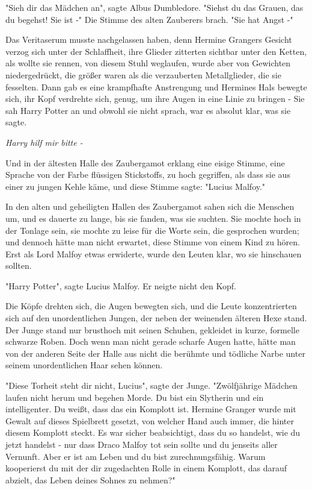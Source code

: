 {"Sieh dir das Mädchen an", sagte Albus Dumbledore. "Siehst du das Grauen, das du begehst! Sie ist -" Die Stimme des alten Zauberers brach. "Sie hat Angst -"

Das Veritaserum musste nachgelassen haben, denn Hermine Grangers Gesicht verzog sich unter der Schlaffheit, ihre Glieder zitterten sichtbar unter den Ketten, als wollte sie rennen, von diesem Stuhl weglaufen, wurde aber von Gewichten niedergedrückt, die größer waren als die verzauberten Metallglieder, die sie fesselten. Dann gab es eine krampfhafte Anstrengung und Hermines Hals bewegte sich, ihr Kopf verdrehte sich, genug, um ihre Augen in eine Linie zu bringen - Sie sah Harry Potter an und obwohl sie nicht sprach, war es absolut klar, was sie sagte.

\emph{Harry hilf mir bitte -}

Und in der ältesten Halle des Zaubergamot erklang eine eisige Stimme, eine Sprache von der Farbe flüssigen Stickstoffs, zu hoch gegriffen, als dass sie aus einer zu jungen Kehle käme, und diese Stimme sagte: "Lucius Malfoy."

In den alten und geheiligten Hallen des Zaubergamot sahen sich die Menschen um, und es dauerte zu lange, bis sie fanden, was sie suchten. Sie mochte hoch in der Tonlage sein, sie mochte zu leise für die Worte sein, die gesprochen wurden; und dennoch hätte man nicht erwartet, diese Stimme von einem Kind zu hören. Erst als Lord Malfoy etwas erwiderte, wurde den Leuten klar, wo sie hinschauen sollten.

"Harry Potter", sagte Lucius Malfoy. Er neigte nicht den Kopf.

Die Köpfe drehten sich, die Augen bewegten sich, und die Leute konzentrierten sich auf den unordentlichen Jungen, der neben der weinenden älteren Hexe stand. Der Junge stand nur brusthoch mit seinen Schuhen, gekleidet in kurze, formelle schwarze Roben. Doch wenn man nicht gerade scharfe Augen hatte, hätte man von der anderen Seite der Halle aus nicht die berühmte und tödliche Narbe unter seinem unordentlichen Haar sehen können.

"Diese Torheit steht dir nicht, Lucius", sagte der Junge. "Zwölfjährige Mädchen laufen nicht herum und begehen Morde. Du bist ein Slytherin und ein intelligenter. Du weißt, dass das ein Komplott ist. Hermine Granger wurde mit Gewalt auf dieses Spielbrett gesetzt, von welcher Hand auch immer, die hinter diesem Komplott steckt. Es war sicher beabsichtigt, dass du so handelst, wie du jetzt handelst - nur dass Draco Malfoy tot sein sollte und du jenseits aller Vernunft. Aber er ist am Leben und du bist zurechnungsfähig. Warum kooperierst du mit der dir zugedachten Rolle in einem Komplott, das darauf abzielt, das Leben deines Sohnes zu nehmen?"

}

